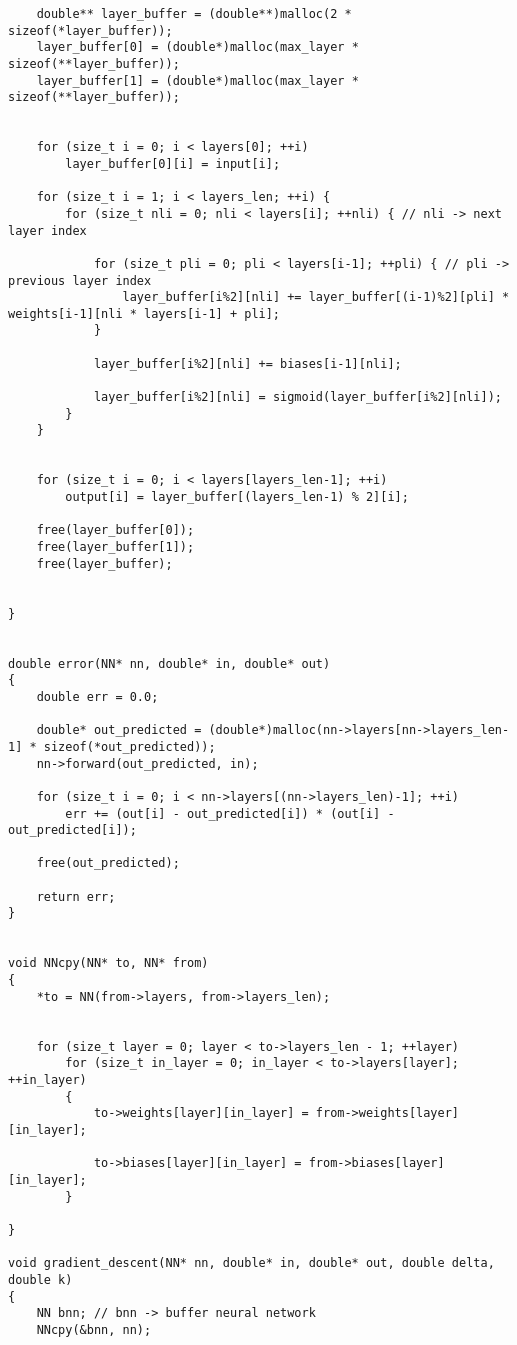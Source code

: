 \documentclass{article}
\begin{document}
\begin{lstlisting}
    double** layer_buffer = (double**)malloc(2 * sizeof(*layer_buffer));
    layer_buffer[0] = (double*)malloc(max_layer * sizeof(**layer_buffer));
    layer_buffer[1] = (double*)malloc(max_layer * sizeof(**layer_buffer));


    for (size_t i = 0; i < layers[0]; ++i)
        layer_buffer[0][i] = input[i];

    for (size_t i = 1; i < layers_len; ++i) {
        for (size_t nli = 0; nli < layers[i]; ++nli) { // nli -> next layer index

            for (size_t pli = 0; pli < layers[i-1]; ++pli) { // pli -> previous layer index
                layer_buffer[i%2][nli] += layer_buffer[(i-1)%2][pli] * weights[i-1][nli * layers[i-1] + pli];
            }

            layer_buffer[i%2][nli] += biases[i-1][nli];

            layer_buffer[i%2][nli] = sigmoid(layer_buffer[i%2][nli]);
        }
    }


    for (size_t i = 0; i < layers[layers_len-1]; ++i)
        output[i] = layer_buffer[(layers_len-1) % 2][i];

    free(layer_buffer[0]);
    free(layer_buffer[1]);
    free(layer_buffer);

    
}


double error(NN* nn, double* in, double* out)
{
    double err = 0.0;
    
    double* out_predicted = (double*)malloc(nn->layers[nn->layers_len-1] * sizeof(*out_predicted));
    nn->forward(out_predicted, in);

    for (size_t i = 0; i < nn->layers[(nn->layers_len)-1]; ++i)
        err += (out[i] - out_predicted[i]) * (out[i] - out_predicted[i]);
    
    free(out_predicted);

    return err;
}


void NNcpy(NN* to, NN* from)
{
    *to = NN(from->layers, from->layers_len);


    for (size_t layer = 0; layer < to->layers_len - 1; ++layer)
        for (size_t in_layer = 0; in_layer < to->layers[layer]; ++in_layer)
        {
            to->weights[layer][in_layer] = from->weights[layer][in_layer];

            to->biases[layer][in_layer] = from->biases[layer][in_layer];
        }

}

void gradient_descent(NN* nn, double* in, double* out, double delta, double k)
{
    NN bnn; // bnn -> buffer neural network
    NNcpy(&bnn, nn);
    

\end{lstlisting}
\end{document}
